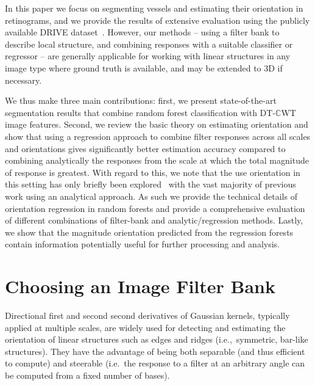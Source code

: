 \documentclass[runningheads,a4paper]{llncs}
\def\dtcwt{DT-$\mathbb{C}$WT}
\def\ie{i.e.}
\begin{document}
In this paper we focus on segmenting vessels and estimating their orientation in retinograms, and we provide the results of extensive evaluation using the publicly available DRIVE dataset~\cite{Staal_etal_TMI04}. However, our methods -- using a filter bank to describe local structure, and combining responses with a suitable classifier or regressor -- are generally applicable for working with linear structures in any image type where ground truth is available, and may be extended to 3D if necessary.

We thus make three main contributions: first, we present state-of-the-art segmentation results that combine random forest classification with \dtcwt{} image features.
Second, we review the basic theory on estimating orientation and show that using a regression approach to combine filter responses across all scales and orientations gives significantly better estimation accuracy compared to combining analytically the responses from the scale at which the total magnitude of response is greatest. With regard to this, we note that the use orientation in this setting has only briefly been explored~\cite{Berks_etal_IPMI11} with the vast majority of previous work using an analytical approach. As such we provide the technical details of orientation regression in random forests and provide a comprehensive evaluation of different combinations of filter-bank and analytic/regression methods. Lastly, we show that the magnitude orientation predicted from the regression forests contain information potentially useful for further processing and analysis.
%
\section{Choosing an Image Filter Bank}
\label{s:filters}
Directional first and second second derivatives of Gaussian kernels, typically applied at multiple scales, are widely used for detecting and estimating the orientation of linear structures such as edges and ridges (\ie,~symmetric, bar-like structures). They have the advantage of being both separable (and thus efficient to compute) and steerable (\ie~the response to a filter at an arbitrary angle can be computed from a fixed number of bases).
\end{document}

